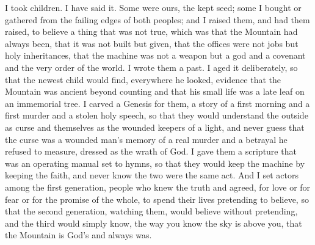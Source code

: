 I took children. I have said it. Some were ours, the kept seed; some I bought or gathered from the failing edges of both peoples; and I raised them, and had them raised, to believe a thing that was not true, which was that the Mountain had always been, that it was not built but given, that the offices were not jobs but holy inheritances, that the machine was not a weapon but a god and a covenant and the very order of the world. I wrote them a past. I aged it deliberately, so that the newest child would find, everywhere he looked, evidence that the Mountain was ancient beyond counting and that his small life was a late leaf on an immemorial tree. I carved a Genesis for them, a story of a first morning and a first murder and a stolen holy speech, so that they would understand the outside as curse and themselves as the wounded keepers of a light, and never guess that the curse was a wounded man's memory of a real murder and a betrayal he refused to measure, dressed as the wrath of God. I gave them a scripture that was an operating manual set to hymns, so that they would keep the machine by keeping the faith, and never know the two were the same act. And I set actors among the first generation, people who knew the truth and agreed, for love or for fear or for the promise of the whole, to spend their lives pretending to believe, so that the second generation, watching them, would believe without pretending, and the third would simply know, the way you know the sky is above you, that the Mountain is God's and always was.\par

